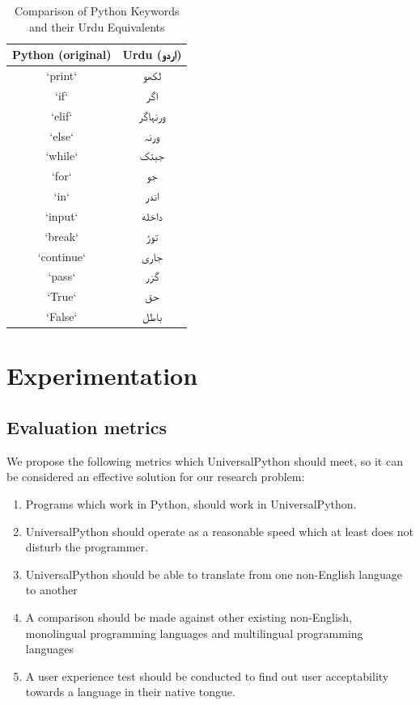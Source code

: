 \documentclass[conference]{IEEEtran}
\begin{document}
\begin{table}[h]
  \centering
  \caption{Comparison of Python Keywords and their Urdu Equivalents}
  \label{tab:python_urdu}
  \vspace{3mm}
\begin{tabular}{|c|c|}
\hline
Python (original) & Urdu (\texturdu{اردو}) \\
\hline
`print` & \texturdu{لکھو} \\
`if` & \texturdu{اگر} \\
`elif` & \texturdu{ورنہاگر} \\
`else` & \texturdu{ورنہ} \\
`while` & \texturdu{جبتک} \\
`for` & \texturdu{جو} \\
`in` & \texturdu{اندر} \\
`input` & \texturdu{داخله} \\
`break` & \texturdu{توڑ} \\
`continue` & \texturdu{جاری} \\
`pass` & \texturdu{گزر} \\
`True` & \texturdu{حق} \\
`False` & \texturdu{باطل} \\
\hline
\end{tabular}
\end{table}

\section{Experimentation}

\subsection{Evaluation metrics}\label{AA}

We propose the following metrics which UniversalPython should meet, so it can be considered an effective solution for our research problem:

\begin{enumerate}

\item Programs which work in Python, should work in UniversalPython.

\item UniversalPython should operate as a reasonable speed which at least does not disturb the programmer.

\item UniversalPython should be able to translate from one non-English language to another

\item A comparison should be made against other existing non-English, monolingual programming languages and multilingual programming languages

\item A user experience test should be conducted to find out user acceptability towards a language in their native tongue.

\end{enumerate}
\end{document}

